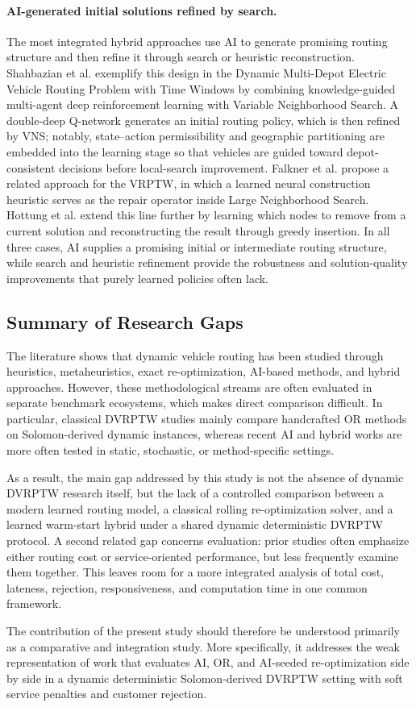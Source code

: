 \paragraph{AI-generated initial solutions refined by search.}
The most integrated hybrid approaches use AI to generate promising routing structure and then refine it through search or heuristic reconstruction. Shahbazian et al. \cite{shahbazianKnowledgeguidedHybridDeep2025} exemplify this design in the Dynamic Multi-Depot Electric Vehicle Routing Problem with Time Windows by combining knowledge-guided multi-agent deep reinforcement learning with Variable Neighborhood Search. A double-deep Q-network generates an initial routing policy, which is then refined by VNS; notably, state--action permissibility and geographic partitioning are embedded into the learning stage so that vehicles are guided toward depot-consistent decisions before local-search improvement. Falkner et al. \cite{falknerLargeNeighborhoodSearch2022} propose a related approach for the VRPTW, in which a learned neural construction heuristic serves as the repair operator inside Large Neighborhood Search. Hottung et al. \cite{Hottung2025} extend this line further by learning which nodes to remove from a current solution and reconstructing the result through greedy insertion. In all three cases, AI supplies a promising initial or intermediate routing structure, while search and heuristic refinement provide the robustness and solution-quality improvements that purely learned policies often lack.
\subsection{Summary of Research Gaps}

The literature shows that dynamic vehicle routing has been studied through heuristics, metaheuristics, exact re-optimization, AI-based methods, and hybrid approaches. However, these methodological streams are often evaluated in separate benchmark ecosystems, which makes direct comparison difficult. In particular, classical DVRPTW studies mainly compare handcrafted OR methods on Solomon-derived dynamic instances, whereas recent AI and hybrid works are more often tested in static, stochastic, or method-specific settings.

As a result, the main gap addressed by this study is not the absence of dynamic DVRPTW research itself, but the lack of a controlled comparison between a modern learned routing model, a classical rolling re-optimization solver, and a learned warm-start hybrid under a shared dynamic deterministic DVRPTW protocol. A second related gap concerns evaluation: prior studies often emphasize either routing cost or service-oriented performance, but less frequently examine them together. This leaves room for a more integrated analysis of total cost, lateness, rejection, responsiveness, and computation time in one common framework.

The contribution of the present study should therefore be understood primarily as a comparative and integration study. More specifically, it addresses the weak representation of work that evaluates AI, OR, and AI-seeded re-optimization side by side in a dynamic deterministic Solomon-derived DVRPTW setting with soft service penalties and customer rejection.